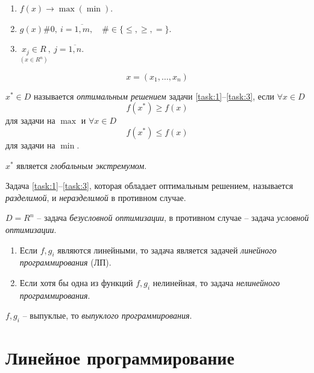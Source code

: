 \newpage

\begin{note}\leavevmode
    \begin{enumerate}
        \item \label{task:1} $ f(x) \rightarrow \max(\min) $.
        \item \label{task:2} $ g(x) \# 0, \ i = \overline{1,m}, \quad \# \in \{\leqslant,\geqslant,=\} $.
        \item \label{task:3} $ \underset{(x\in R^n)}{x_j \in R}, \ j = \overline{1,n} $.
    \end{enumerate}
    \[
        x = (x_1,\ldots,x_n)
    \]
\end{note}

\begin{definition}
    $ x^* \in D $ называется \emph{оптимальным решением} задачи \ref{task:1}--\ref{task:3}, если $ \forall x \in D $
    \[
        f(x^*) \geqslant f(x)
    \]
    для задачи на $ \max $ и $ \forall x \in D $
    \[
        f(x^*) \leqslant f(x)
    \]
    для задачи на $ \min $.

    $ x^* $ является \emph{глобальным экстремумом}.
\end{definition}

\begin{definition}
    Задача \ref{task:1}--\ref{task:3}, которая обладает оптимальным решением, называется \emph{разделимой}, и \emph{неразделимой} в противном случае.

    $ D = R^n $ -- задача \emph{безусловной оптимизации}, в противном случае -- задача \emph{условной оптимизации}.
\end{definition}

\begin{note}[Классификация]\leavevmode
    \begin{enumerate}
        \item Если $ f,g_i $ являются линейными, то задача является задачей \emph{линейного программирования} (ЛП).
        \item Если хотя бы одна из функций $ f,g_i $ нелинейная, то задача \emph{нелинейного программирования}.
    \end{enumerate}
    $ f,g_i $ -- выпуклые, то \emph{выпуклого программирования}.
\end{note}

\chapter{Линейное программирование}

